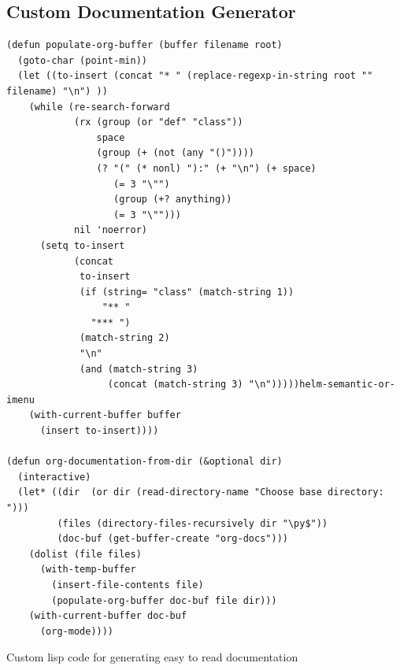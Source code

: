 \documentclass[11pt]{report}
\begin{document}
\subsection{Custom Documentation Generator}
\label{sec:org7751265}
\begin{listing}[htbp]
\begin{verbatim}
(defun populate-org-buffer (buffer filename root)
  (goto-char (point-min))
  (let ((to-insert (concat "* " (replace-regexp-in-string root "" filename) "\n") ))
    (while (re-search-forward
            (rx (group (or "def" "class"))
                space
                (group (+ (not (any "()"))))
                (? "(" (* nonl) "):" (+ "\n") (+ space)
                   (= 3 "\"")
                   (group (+? anything))
                   (= 3 "\"")))
            nil 'noerror)
      (setq to-insert
            (concat
             to-insert
             (if (string= "class" (match-string 1))
                 "** "
               "*** ")
             (match-string 2)
             "\n"
             (and (match-string 3)
                  (concat (match-string 3) "\n")))))helm-semantic-or-imenu
    (with-current-buffer buffer
      (insert to-insert))))

(defun org-documentation-from-dir (&optional dir)
  (interactive)
  (let* ((dir  (or dir (read-directory-name "Choose base directory: ")))
         (files (directory-files-recursively dir "\py$"))
         (doc-buf (get-buffer-create "org-docs")))
    (dolist (file files)
      (with-temp-buffer
        (insert-file-contents file)
        (populate-org-buffer doc-buf file dir)))
    (with-current-buffer doc-buf
      (org-mode))))
\end{verbatim}
\caption{\label{orgdbf3e7b}
Custom lisp code for generating easy to read documentation}
\end{listing}

\clearpage
\end{document}
